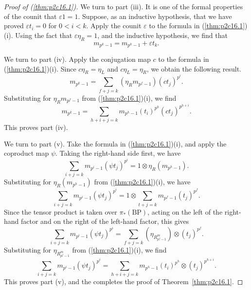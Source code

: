 \documentclass[../main]{subfiles}
\begin{document}
\begin{proof}[Proof of (\ref{thm:p2c16.1})]
We turn to part (iii). It is one of the formal properties of the counit that $\varepsilon 1 = 1$. Suppose, as an inductive hypothesis, that we have proved $\varepsilon t_i = 0$ for $0 < i < k$. Apply the counit $\varepsilon$ to the formula in (\ref{thm:p2c16.1})(i). Using the fact that $\varepsilon \eta_R = 1$, and the inductive hypothesis, we find that \[m_{p^k - 1} = m_{p^k - 1} + \varepsilon t_k.\] 

We turn to part (iv). Apply the conjugation map $c$ to the formula in (\ref{thm:p2c16.1})(i). Since $c \eta_R = \eta_L$ and $c \eta_L = \eta_R$, we obtain the following result. \[m_{p^k - 1} = \sum_{f + j = k} (\eta_R m_{p^f - 1}) (ct_j)^{p^i}.\] Substituting for $\eta_R m_{p^f - 1}$ from (\ref{thm:p2c16.1})(i), we find \[m_{p^k - 1} = \sum_{h + i + j = k} m_{p^h - 1} (t_i)^{p^h} (ct_j)^{p^{h + i}}.\] This proves part (iv).

We turn to part (v). Take the formula in (\ref{thm:p2c16.1})(i), and apply the coproduct map $\psi$. Taking the right-hand side first, we have \[\sum_{i + j = k} m_{p^i - 1} (\psi t_j)^{p^i} = 1 \otimes \eta_R (m_{p^h - 1}).\] Substituting for $\eta_R(m_{p^h - 1})$ from (\ref{thm:p2c16.1})(i), we have \[\sum_{i + j = k} m_{p^i - 1} (\psi t_j)^{p^i} = 1 \otimes \sum_{t + j = k} m_{p^f - 1} (t_j)^{p^f}.\] Since the tensor product is taken over $\pi_\ast(\mathrm {BP})$, acting on the left of the right-hand factor and on the right of the left-hand factor, this gives \[\sum_{i + j = k} m_{p^i - 1} (\psi t_j)^{p^i} = \sum_{f + j = k} (\eta_{R^m_{p^f - 1}}) \otimes (t_j)^{p^f}.\] Substituting for $\eta_{R^m_{p^f - 1}}$ from (\ref{thm:p2c16.1})(i), we find \[\sum_{i + j = k} m_{p^i - 1} (\psi t_j)^{p^i} = \sum_{h + i + j = k} m_{p^h - 1} (t_i)^{p^h} \otimes (t_j)^{p^{h + i}}.\] This proves part (v), and the completes the proof of Theorem~\ref{thm:p2c16.1}.
\end{proof}
\end{document}
